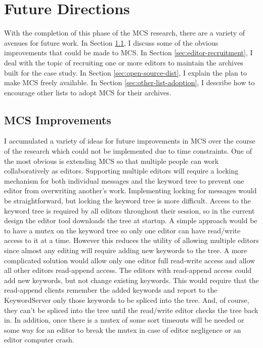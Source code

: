 \section{Future Directions}
\label{sec:future-directions}
With the completion of this phase of the MCS research, there are a variety of
avenues for future work. In Section \ref{sec:mcs-improvements}, I discuss some
of the obvious improvements that could be made to MCS. In Section
\ref{sec:editor-recruitment}, I deal with the topic of recruiting one or more
editors to maintain the archives built for the case study. In Section
\ref{sec:open-source-dist}, I explain the plan to make MCS freely available. In
Section \ref{sec:other-list-adoption}, I describe how to encourage other lists
to adopt MCS for their archives.

\subsection{MCS Improvements}
\label{sec:mcs-improvements}
I accumulated a variety of ideas for future improvements in MCS over the course
of the research which could not be implemented due to time constraints. One of
the most obvious is extending MCS so that multiple people can work
collaboratively as editors. Supporting multiple editors will require a locking
mechanism for both individual messages and the keyword tree to prevent one
editor from overwriting another's work. Implementing locking for messages would
be straightforward, but locking the keyword tree is more difficult. Access to
the keyword tree is required by all editors throughout their session, so in the
current design the editor tool downloads the tree at startup. A simple approach
would be to have a mutex on the keyword tree so only one editor can have
read/write access to it at a time. However this reduces the utility of allowing
multiple editors since almost any editing will require adding new keywords to
the tree. A more complicated solution would allow only one editor full
read-write access and allow all other editors read-append access. The editors
with read-append access could add new keywords, but not change existing
keywords. This would require that the read-append clients remember the added
keywords and report to the KeywordServer only those keywords to be spliced into
the tree. And, of course, they can't be spliced into the tree until the
read/write editor checks the tree back in. In addition, once there is a mutex
of some sort timeouts will be needed or some way for an editor to break the
mutex in case of editor negligence or an editor computer crash.

